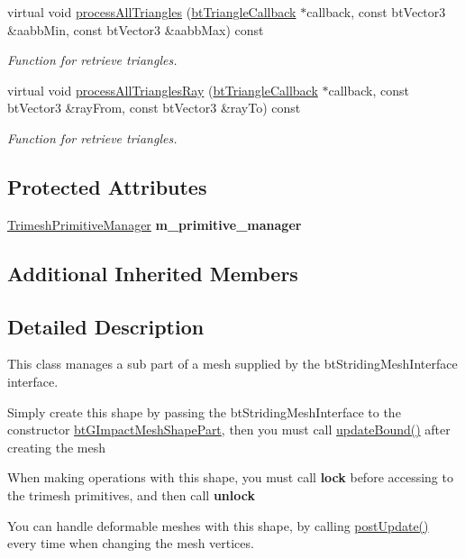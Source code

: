 \begin{DoxyCompactItemize}
\item 
virtual void \hyperlink{classbt_g_impact_mesh_shape_part_a230a814ad9f784638e8bcbf0592cdd39}{process\+All\+Triangles} (\hyperlink{classbt_triangle_callback}{bt\+Triangle\+Callback} $\ast$callback, const bt\+Vector3 \&aabb\+Min, const bt\+Vector3 \&aabb\+Max) const 
\begin{DoxyCompactList}\small\item\em Function for retrieve triangles. \end{DoxyCompactList}\item 
virtual void \hyperlink{classbt_g_impact_mesh_shape_part_a0e35b55bd50911911f8164cf3a2dd5c8}{process\+All\+Triangles\+Ray} (\hyperlink{classbt_triangle_callback}{bt\+Triangle\+Callback} $\ast$callback, const bt\+Vector3 \&ray\+From, const bt\+Vector3 \&ray\+To) const 
\begin{DoxyCompactList}\small\item\em Function for retrieve triangles. \end{DoxyCompactList}\end{DoxyCompactItemize}
\subsection*{Protected Attributes}
\begin{DoxyCompactItemize}
\item 
\hypertarget{classbt_g_impact_mesh_shape_part_aa5d55e9f76ff77f26db1658e4c7f021d}{\hyperlink{classbt_g_impact_mesh_shape_part_1_1_trimesh_primitive_manager}{Trimesh\+Primitive\+Manager} {\bfseries m\+\_\+primitive\+\_\+manager}}\label{classbt_g_impact_mesh_shape_part_aa5d55e9f76ff77f26db1658e4c7f021d}

\end{DoxyCompactItemize}
\subsection*{Additional Inherited Members}


\subsection{Detailed Description}
This class manages a sub part of a mesh supplied by the bt\+Striding\+Mesh\+Interface interface. 


\begin{DoxyItemize}
\item Simply create this shape by passing the bt\+Striding\+Mesh\+Interface to the constructor \hyperlink{classbt_g_impact_mesh_shape_part}{bt\+G\+Impact\+Mesh\+Shape\+Part}, then you must call \hyperlink{classbt_g_impact_shape_interface_acb26c2d7a2aecabd06b996b72b848492}{update\+Bound()} after creating the mesh
\item When making operations with this shape, you must call {\bfseries lock} before accessing to the trimesh primitives, and then call {\bfseries unlock}
\item You can handle deformable meshes with this shape, by calling \hyperlink{classbt_g_impact_shape_interface_ac430754948ac92d6f70b81e88416c96a}{post\+Update()} every time when changing the mesh vertices. 
\end{DoxyItemize}

